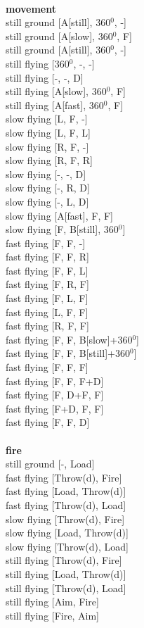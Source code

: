 \ \\ {\bf movement } \\
still ground [A[still], 360$^0$, -] \\
still ground [A[slow], 360$^0$, F] \\
still ground [A[still], 360$^0$, -] \\
still flying [360$^0$, -, -] \\
still flying [-, -, D] \\
still flying [A[slow], 360$^0$, F] \\
still flying [A[fast], 360$^0$, F] \\
slow flying [L, F, -] \\
slow flying [L, F, L] \\
slow flying [R, F, -] \\
slow flying [R, F, R] \\
slow flying [-, -, D] \\
slow flying [-, R, D] \\
slow flying [-, L, D] \\
slow flying [A[fast], F, F] \\
slow flying [F, B[still], 360$^0$] \\
fast flying [F, F, -] \\
fast flying [F, F, R] \\
fast flying [F, F, L] \\
fast flying [F, R, F] \\
fast flying [F, L, F] \\
fast flying [L, F, F] \\
fast flying [R, F, F] \\
fast flying [F, F, B[slow]+360$^0$] \\
fast flying [F, F, B[still]+360$^0$] \\
fast flying [F, F, F] \\
fast flying [F, F, F+D] \\
fast flying [F, D+F, F] \\
fast flying [F+D, F, F] \\
fast flying [F, F, D] \\
\ \\ {\bf fire } \\
still ground [-, Load] \\
fast flying [Throw(d), Fire] \\
fast flying [Load, Throw(d)] \\
fast flying [Throw(d), Load] \\
slow flying [Throw(d), Fire] \\
slow flying [Load, Throw(d)] \\
slow flying [Throw(d), Load] \\
still flying [Throw(d), Fire] \\
still flying [Load, Throw(d)] \\
still flying [Throw(d), Load] \\
still flying [Aim, Fire] \\
still flying [Fire, Aim] \\


